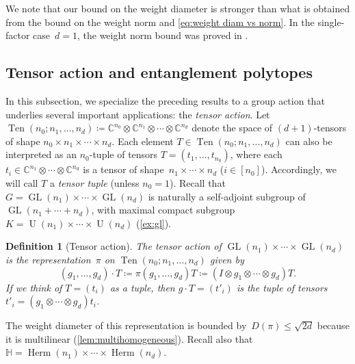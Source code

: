 \documentclass[11pt,letterpaper]{article}
\newtheorem{definition}[theorem]{Definition}\AddToHook{env/definition/begin}{\crefalias{theorem}{definition}}
\numberwithin{equation}{section}
\newcommand{\CC}{\mathbb{C}}
\newcommand{\bbH}{\mathbb{H}}
\DeclareMathOperator{\U}{U}
\DeclareMathOperator{\GL}{GL}
\DeclareMathOperator{\Herm}{Herm}
\DeclareMathOperator{\Ten}{Ten}
\begin{document}
We note that our bound on the weight diameter is stronger than what is obtained from the bound on the weight norm and \cref{eq:weight diam vs norm}.
In the single-factor case~$d=1$, the weight norm bound was proved in \cite[Lem.~6.1]{BFGOWW2019}.

\subsection{Tensor action and entanglement polytopes}\label{sub:entanglementpolytope}
In this subsection, we specialize the preceding results to a group action that underlies several important applications:
the \emph{tensor action}.
Let $\Ten(n_0; n_1, \ldots, n_d) \coloneqq \CC^{n_0}\otimes\CC^{n_1}\otimes\cdots\otimes\CC^{n_d}$ denote the space of $(d+1)$-tensors of shape $n_0\times n_1\times\cdots\times n_d$.
Each element $T \in \Ten(n_0; n_1, \ldots, n_d)$ can also be interpreted as an $n_0$-tuple of tensors $T = (t_1, \ldots, t_{n_0})$, where each $t_i \in \CC^{n_1}\otimes\cdots\otimes\CC^{n_d}$ is a tensor of shape~$n_1\times\cdots\times n_d$ ($i \in [n_0]$).
Accordingly, we will call $T$ a \emph{tensor tuple} (unless $n_0 = 1$).
Recall that $G = \GL(n_1)\times\cdots\times \GL(n_d)$ is naturally a self-adjoint subgroup of~$\GL(n_1+\cdots+n_d)$, with maximal compact subgroup $K = \U(n_1)\times\cdots\times\U(n_d)$ (\cref{ex:gl}).

\begin{definition}[Tensor action]
The \emph{tensor action} of $\GL(n_1)\times\cdots\times \GL(n_d)$ is the representation~$\pi$ on $\Ten(n_0;n_1,\ldots,n_d)$ given by
\begin{equation}\label{eq:tensor action}
    (g_1, \ldots, g_d) \cdot T \coloneqq \pi(g_1,\dots,g_d)T \coloneqq (I\otimes g_1\otimes\cdots\otimes g_d)T.
\end{equation}
If we think of $T=(t_i)$ as a tuple, then $g \cdot T=(t'_i)$ is the tuple of tensors $t'_i = (g_1\otimes\cdots\otimes g_d)t_i$.
\end{definition}

The weight diameter of this representation is bounded by~$D(\pi) \leq \sqrt{2d}$ because it is multilinear (\cref{lem:multihomogeneous}).
Recall also that $\bbH = \Herm(n_1) \times \cdots \times \Herm(n_d)$.
\end{document}
